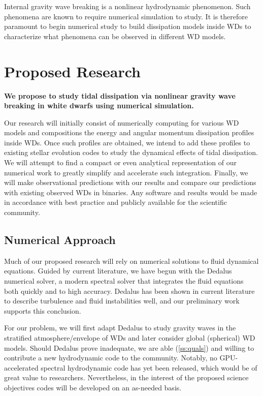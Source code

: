 \documentclass[11pt,
        usenames, %
        dvipsnames %
    ]{article}
\begin{document}
Internal gravity wave breaking is a nonlinear hydrodynamic phenomenon. Such
phenomena are known to require numerical simulation to study. It is therefore
paramount to begin numerical study to build dissipation models inside WDs to
characterize what phenomena can be observed in different WD models.

\section{Proposed Research}

\textbf{We propose to study tidal dissipation via nonlinear gravity wave
breaking in white dwarfs using numerical simulation.}

Our research will initially consist of numerically computing for various WD
models and compositions the energy and angular momentum dissipation profiles
inside WDs. Once such profiles are obtained, we intend to add these profiles to
existing stellar evolution codes to study the dynamical effects of tidal
dissipation. We will attempt to find a compact or even analytical representation
of our numerical work to greatly simplify and accelerate such integration.
Finally, we will make observational predictions with our results and compare our
predictions with existing observed WDs in binaries. Any software and results
would be made in accordance with best practice and publicly available for the
scientific community.

\subsection{Numerical Approach}

Much of our proposed research will rely on numerical solutions to fluid
dynamical equations. Guided by current literature, we have begun with the
Dedalus numerical solver, a modern spectral solver that integrates the fluid
equations both quickly and to high accuracy\cite{dedalus}. Dedalus has been
shown in current literature to describe turbulence and fluid instabilities well,
and our preliminary work supports this conclusion.

For our problem, we will first adapt Dedalus to study gravity waves in the
stratified atmosphere/envelope of WDs and later consider global (spherical) WD
models. Should Dedalus prove inadequate, we are able (\autoref{ss:quals}) and
willing to contribute a new hydrodynamic code to the community. Notably, no
GPU-accelerated spectral hydrodynamic code has yet been released, which would be
of great value to researchers. Nevertheless, in the interest of the proposed
science objectives codes will be developed on an as-needed basis.
\end{document}
